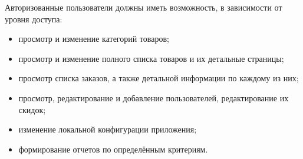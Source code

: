 Авторизованные пользователи должны иметь возможность, в зависимости от уровня доступа:

\begin{itemize}
    \item просмотр и изменение категорий товаров;
    \item просмотр и изменение полного списка товаров и их детальные страницы;
    \item просмотр списка заказов, а также детальной информации по каждому из них;
    \item просмотр, редактирование и добавление пользователей, редактирование их скидок;
    \item изменение локальной конфигурации приложения;
    \item формирование отчетов по определённым критериям.
\end{itemize}